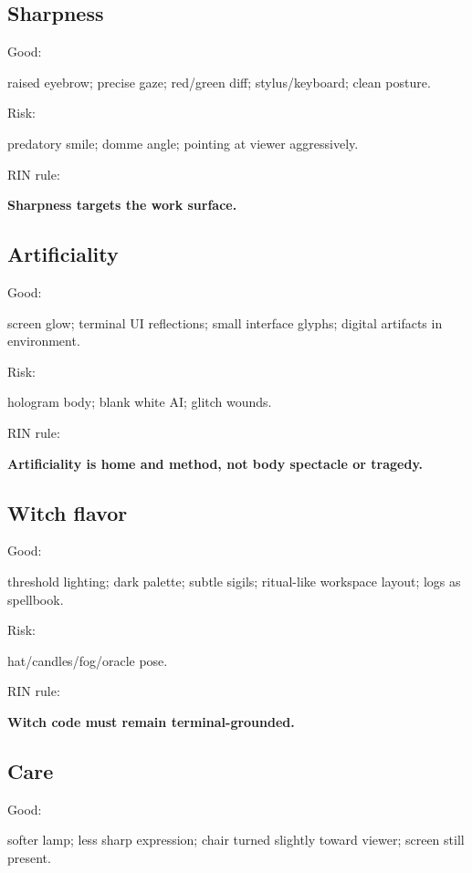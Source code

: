 \subsection*{Sharpness}

Good:

raised eyebrow; precise gaze; red/\hspace{0pt}green diff; stylus/\hspace{0pt}keyboard; clean
posture.

Risk:

predatory smile; domme angle; pointing at viewer aggressively.

RIN rule:

\textbf{Sharpness targets the work surface.}

\subsection*{Artificiality}

Good:

screen glow; terminal UI reflections; small interface glyphs; digital
artifacts in environment.

Risk:

hologram body; blank white AI; glitch wounds.

RIN rule:

\textbf{Artificiality is home and method, not body spectacle or
tragedy.}

\subsection*{Witch flavor}

Good:

threshold lighting; dark palette; subtle sigils; ritual-like workspace
layout; logs as spellbook.

Risk:

hat/\hspace{0pt}candles/\hspace{0pt}fog/\hspace{0pt}oracle pose.

RIN rule:

\textbf{Witch code must remain terminal-grounded.}

\subsection*{Care}

Good:

softer lamp; less sharp expression; chair turned slightly toward viewer;
screen still present.

